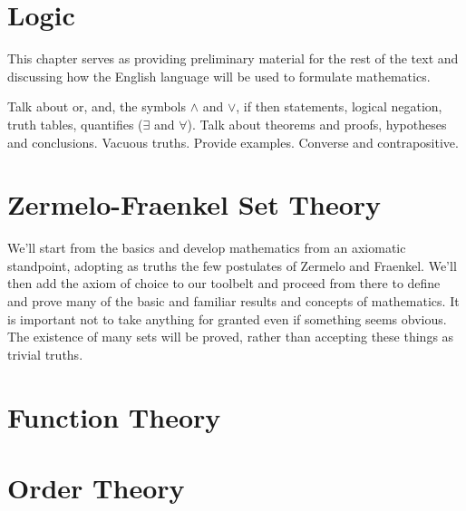 \chapter{Logic}
    This chapter serves as providing preliminary material for the rest of
    the text and discussing how the English language will be used to formulate
    mathematics.
    \par\hfill\par
    Talk about or, and, the symbols $\land$ and $\lor$, if then statements,
    logical negation, truth tables, quantifies ($\exists$ and $\forall$).
    Talk about theorems and proofs, hypotheses and conclusions.
    Vacuous truths. Provide examples. Converse and contrapositive.
\chapter{Zermelo-Fraenkel Set Theory}
    We'll start from the basics and develop mathematics from an axiomatic
    standpoint, adopting as truths the few postulates of Zermelo and
    Fraenkel. We'll then add the axiom of choice to our toolbelt and
    proceed from there to define and prove many of the basic and familiar
    results and concepts of mathematics. It is important not to take anything
    for granted even if something seems obvious. The existence of many sets
    will be proved, rather than accepting these things as trivial truths.
    \ifcsname\PATH\endcsname
        \newcommand{\PATH}{books/Foundations/ZFC}
    \else
        \renewcommand{\PATH}{books/Foundations/ZFC}
    \fi




    
\chapter{Function Theory}
    
\chapter{Order Theory}
    